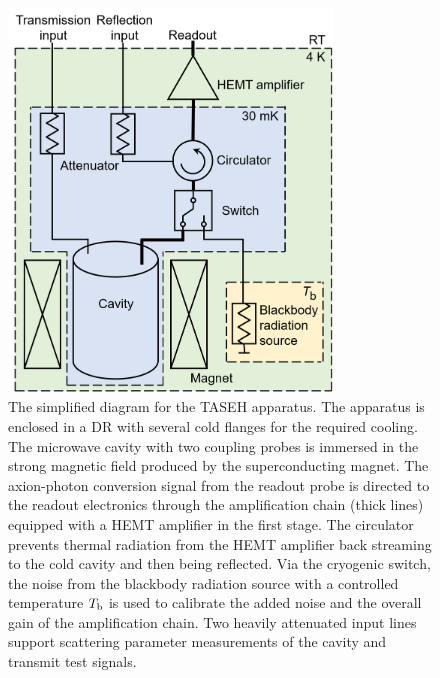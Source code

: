 \documentclass[%
 reprint,prl, %
superscriptaddress,
nobibnotes,
 amsmath,amssymb,
 aps,
]{revtex4-2}
\begin{document}
\begin{figure} 
  \centering
  \includegraphics[width=8.6cm]{figures/colored_Simplified_wiring_V2.png}
  \caption{%
The simplified diagram for the TASEH apparatus. 
The apparatus is enclosed in a DR with several cold flanges for 
the required cooling. 
The microwave cavity with two coupling probes is immersed in the strong 
magnetic field produced by the superconducting magnet.
The axion-photon conversion signal from the readout probe is directed 
to the readout electronics through the amplification chain (thick lines) 
equipped with a HEMT amplifier in the first stage. 
The circulator prevents thermal radiation from the HEMT amplifier back 
streaming to the cold cavity and then being reflected. Via the
cryogenic switch, the noise from the blackbody radiation source with a 
controlled temperature $T_{\text b}$ is used to calibrate the added noise and 
the overall gain of the amplification chain. Two heavily attenuated input 
lines support scattering parameter measurements of the cavity and transmit 
test signals. 
  }
  \label{fig:TASEH}
\end{figure}
\end{document}

